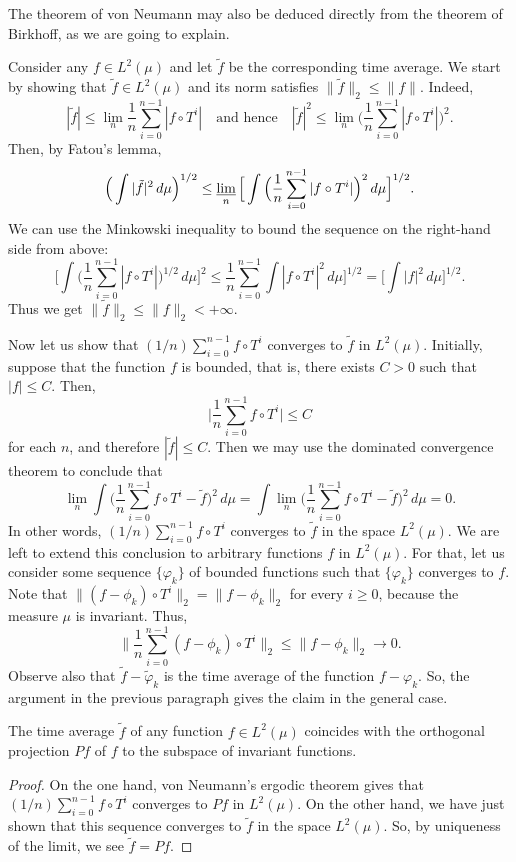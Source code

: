 The theorem of von Neumann may also be deduced directly from the theorem of Birkhoff, as we are going to explain.\par
Consider any $f\in L^2(\mu)$ and let $\tilde{f}$ be the corresponding time average. We start by showing that $\tilde{f}\in L^2(\mu)$ and its norm satisfies $\|\tilde{f}\|_2\leq\|f\|$. Indeed,
\[|\tilde{f}|\leq\lim_n\frac{1}{n}\sum_{i=0}^{n-1}|f\circ T^i|\quad\text{and hence}\quad|\tilde{f}|^2\leq\lim_n\Big(\frac{1}{n}\sum_{i=0}^{n-1}|f\circ T^i|\Big)^2.\]
Then, by Fatou's lemma,
\[\Big(\int|\tilde{f}|^2\,d\mu\Big)^{1/2}\leq\varliminf_n\Big[\int\Big(\frac{1}{n}\sum_{i=0}^{n-1}|f\circ T^i|\Big)^2\,d\mu\Big]^{1/2}.\]
We can use the Minkowski inequality to bound the sequence on the right-hand side from above:
\[\Big[\int\Big(\frac{1}{n}\sum_{i=0}^{n-1}|f\circ T^i|\Big)^{1/2}\,d\mu\Big]^2\leq\frac{1}{n}\sum_{i=0}^{n-1}\int|f\circ T^i|^2\,d\mu\Big]^{1/2}=\Big[\int|f|^2\,d\mu\Big]^{1/2}.\]
Thus we get $\|\tilde{f}\|_2\leq\|f\|_2<+\infty$.\par
Now let us show that $(1/n)\sum_{i=0}^{n-1}f\circ T^i$ converges to $\tilde{f}$ in $L^2(\mu)$. Initially, suppose that the function $f$ is bounded, that is, there exists $C>0$ such that $|f|\leq C$. Then,
\[\Big|\frac{1}{n}\sum_{i=0}^{n-1}f\circ T^i\Big|\leq C\]
for each $n$, and therefore $|\tilde{f}|\leq C$. Then we may use the dominated convergence theorem to conclude that
\[\lim_n\int\Big(\frac{1}{n}\sum_{i=0}^{n-1}f\circ T^i-\tilde{f}\Big)^2\,d\mu=\int\lim_n\Big(\frac{1}{n}\sum_{i=0}^{n-1}f\circ T^i-\tilde{f}\Big)^2\,d\mu=0.\]
In other words, $(1/n)\sum_{i=0}^{n-1}f\circ T^i$ converges to $\tilde{f}$ in the space $L^2(\mu)$. We are left to extend this conclusion to arbitrary functions $f$ in $L^2(\mu)$. For that, let us consider some sequence $\{\varphi_k\}$ of bounded functions such that $\{\varphi_k\}$ converges to $f$. Note that $\|(f-\phi_k)\circ T^i\|_2=\|f-\phi_k\|_2$ for every $i\geq 0$, because the measure $\mu$ is invariant. Thus,
\[\Big\|\frac{1}{n}\sum_{i=0}^{n-1}(f-\phi_k)\circ T^i\Big\|_2\leq\|f-\phi_k\|_2\to 0.\]
Observe also that $\tilde{f}-\tilde{\varphi}_k$ is the time average of the function $f-\varphi_k$. So, the argument in the previous paragraph gives the claim in the general case.
\begin{proposition}
The time average $\tilde{f}$ of any function $f\in L^2(\mu)$ coincides with the orthogonal projection $Pf$ of $f$ to the subspace of invariant functions.
\end{proposition}
\begin{proof}
On the one hand, von Neumann's ergodic theorem gives that $(1/n)\sum_{i=0}^{n-1}f\circ T^i$ converges to $Pf$ in $L^2(\mu)$. On the other hand, we have just shown that this sequence converges to $\tilde{f}$ in the space $L^2(\mu)$. So, by uniqueness of the limit, we see $\tilde{f}=Pf$.
\end{proof}
